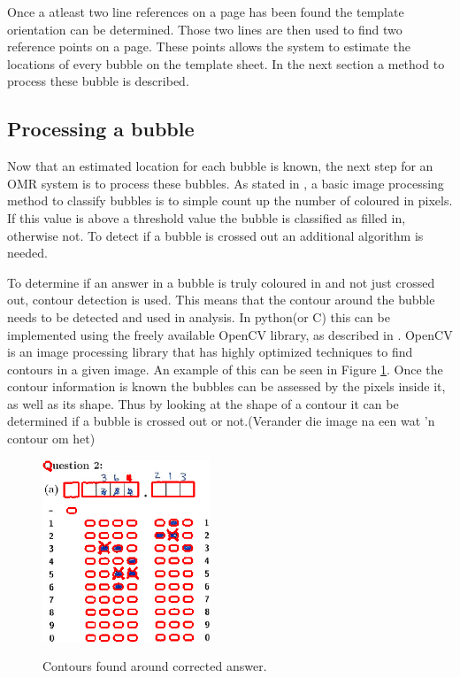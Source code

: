 Once a atleast two line references on a page has been found the template orientation can be determined. Those two lines are then used to find two reference points on a page. These points allows the system to estimate the locations of every bubble on the template sheet. In the next section a method to process these bubble is described.

\subsection{Processing a bubble}

Now that an estimated location for each bubble is known, the next step for an OMR system is to process these bubbles. As stated in \citet{MVGI2015}, a basic image processing method to classify bubbles is to simple count up the number of coloured in pixels. If this value is above a threshold value the bubble is classified as filled in, otherwise not. To detect if a bubble is crossed out an additional algorithm is needed.

To determine if an answer in a bubble is truly coloured in and not just crossed out, contour detection is used. This means that the contour around the bubble needs to be detected and used in analysis. In python(or C) this can be implemented using the freely available OpenCV library, as described in \citet{AdrianR2016}. OpenCV is an image processing library that has highly optimized techniques to find contours in a given image. An example of this can be seen in Figure \ref{fig:Cross}. Once the contour information is known the bubbles can be assessed by the pixels inside it, as well as its shape. Thus by looking at the shape of a contour it can be determined if a bubble is crossed out or not.(Verander die image na een wat 'n contour om het)


\begin{figure}
  \centering
  \includegraphics[width=5cm]{Cross}\\
  \caption{Contours found around corrected answer.}
  \label{fig:Cross}
\end{figure}


